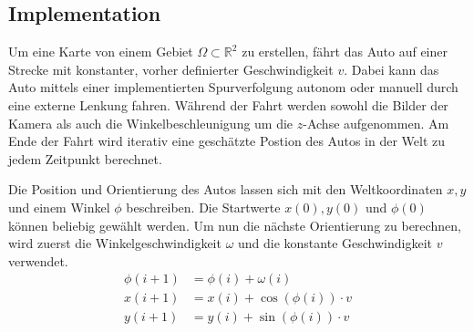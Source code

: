 \subsection{Implementation}

Um eine Karte von einem Gebiet $ \Omega \subset \mathbb{R}^2$ zu erstellen, fährt das Auto auf einer Strecke mit konstanter, vorher definierter Geschwindigkeit $v$. Dabei kann das Auto mittels einer implementierten Spurverfolgung autonom oder manuell durch eine externe Lenkung fahren. 
Während der Fahrt werden sowohl die Bilder der Kamera 
als auch die Winkelbeschleunigung um die $z$-Achse 
aufgenommen. Am Ende der Fahrt wird iterativ eine geschätzte Postion des Autos in der Welt zu jedem Zeitpunkt berechnet.

Die Position und Orientierung des Autos lassen sich mit den Weltkoordinaten $x,y$ und einem Winkel $\phi$ beschreiben. Die Startwerte $x(0),y(0)$ und $\phi(0)$ können beliebig gewählt werden. Um nun die nächste Orientierung zu berechnen, wird zuerst die Winkelgeschwindigkeit $\omega$ und die konstante Geschwindigkeit $v$ verwendet.
$$
\begin{aligned}
\phi(i+1)&=\phi(i)+\omega(i)\\
x(i+1)&=x(i)+\cos(\phi(i))\cdot v\\
y(i+1)&=y(i)+\sin(\phi(i))\cdot v
\end{aligned}
$$

\hspace{-12mm}
\begin{figure}[htp]

\sbox{}
\setlength{\twosubht}{\ht\twosubbox}


\centering

\quad
{}


\end{figure}


